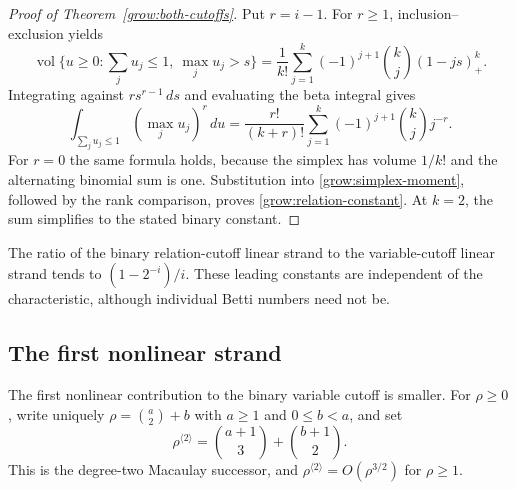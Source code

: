 \begin{proof}[Proof of Theorem~\ref{grow:both-cutoffs}]
Put $r=i-1$. For $r\ge1$, inclusion--exclusion yields
\[
 \operatorname{vol}\{u\ge0:\textstyle\sum_ju_j\le1,\ \max_j u_j>s\}
 =\frac{1}{k!}\sum_{j=1}^k(-1)^{j+1}\binom kj(1-js)_+^k.
\]
Integrating against $r s^{r-1}\,ds$ and evaluating the beta integral gives
\[
 \int_{\sum_ju_j\le1}(\max_j u_j)^r\,du
 =\frac{r!}{(k+r)!}\sum_{j=1}^k(-1)^{j+1}\binom kj j^{-r}.
\]
For $r=0$ the same formula holds, because the simplex has volume $1/k!$
and the alternating binomial sum is one. Substitution into
\eqref{grow:simplex-moment}, followed by the rank comparison, proves
\eqref{grow:relation-constant}. At $k=2$, the sum simplifies to the
stated binary constant.
\end{proof}

The ratio of the binary
relation-cutoff linear strand to the variable-cutoff linear strand
tends to $(1-2^{-i})/i$. These leading constants are independent of
the characteristic, although individual Betti numbers need not be.

\subsection{The first nonlinear strand}

The first nonlinear contribution to the binary variable cutoff is
smaller. For $\rho\ge0$, write uniquely
$\rho=\binom a2+b$ with $a\ge1$ and $0\le b<a$, and set
\[
 \rho^{\langle2\rangle}=\binom{a+1}{3}+\binom{b+1}{2}.
\]
This is the degree-two Macaulay successor, and
$\rho^{\langle2\rangle}=O(\rho^{3/2})$ for $\rho\ge1$.

